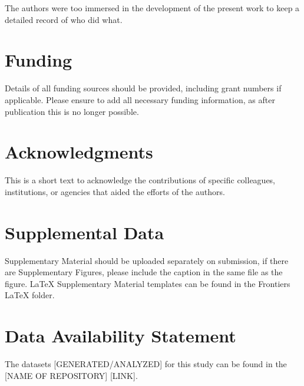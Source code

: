 \documentclass[utf8]{FrontiersinHarvard} %
\providecommand{\href}[2]{#2}
\renewcommand*{\|}[1][]{\nonscript\:#1\vert\nonscript\:\mathopen{}}
\begin{document}
The authors were too immersed in the development of the present work to keep a detailed record of who did what.


\section*{Funding}
Details of all funding sources should be provided, including grant numbers if applicable. Please ensure to add all necessary funding information, as after publication this is no longer possible.

\section*{Acknowledgments}
This is a short text to acknowledge the contributions of specific colleagues, institutions, or agencies that aided the efforts of the authors.

\section*{Supplemental Data}
 \href{http://home.frontiersin.org/about/author-guidelines#SupplementaryMaterial}{Supplementary Material} should be uploaded separately on submission, if there are Supplementary Figures, please include the caption in the same file as the figure. LaTeX Supplementary Material templates can be found in the Frontiers LaTeX folder.

\section*{Data Availability Statement}
The datasets [GENERATED/ANALYZED] for this study can be found in the [NAME OF REPOSITORY] [LINK].
\end{document}
